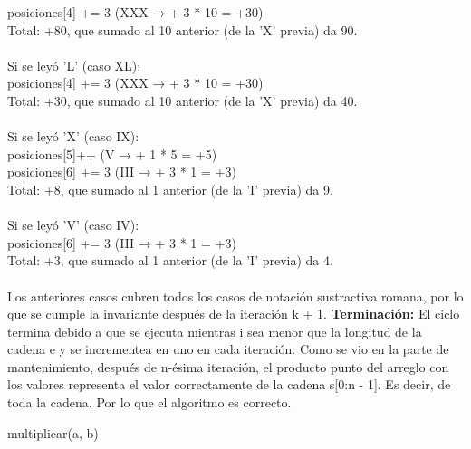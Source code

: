 \documentclass[12pt]{article}
\begin{document}
\begin{itemize}
    posiciones[4] += 3 (XXX → + 3 * 10 = +30)\\
    Total: +80, que sumado al 10 anterior (de la 'X' previa) da 90.\\\\
    Si se leyó 'L' (caso XL):\\
    posiciones[4] += 3 (XXX → + 3 * 10 = +30)\\
    Total: +30, que sumado al 10 anterior (de la 'X' previa) da 40.\\\\
    Si se leyó 'X' (caso IX):\\
    posiciones[5]++ (V → + 1 * 5 = +5)\\
    posiciones[6] += 3 (III → + 3 * 1 = +3)\\
    Total: +8, que sumado al 1 anterior (de la 'I' previa) da 9.\\\\
    Si se leyó 'V' (caso IV):\\
    posiciones[6] += 3 (III → + 3 * 1 = +3)\\
    Total: +3, que sumado al 1 anterior (de la 'I' previa) da 4.\\\\
    Los anteriores casos cubren todos los casos de notación sustractiva romana, por lo que se cumple la invariante después de la iteración k + 1.
    \textbf{Terminación:} El ciclo termina debido a que se ejecuta mientras i sea menor que la longitud de la cadena e y se incrementea en uno en cada iteración.
    Como se vio en la parte de mantenimiento, después de n-ésima iteración, el producto punto del arreglo con los valores representa el valor correctamente de la cadena s[0:n - 1]. Es decir, de toda la cadena. Por lo que el algoritmo es correcto.

    \begin{algorithm}[H]
    \caption{multiplicar(a, b)}
    \SetAlgoLined
\end{algorithm}
\end{itemize}
\end{document}
